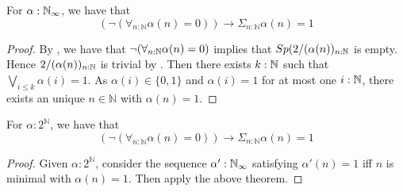 \begin{theorem}\label{MarkovPrinciple}
  For $\alpha:\mathbb{N}_{\infty}$, we have that 
  \begin{equation}
    (\neg (\forall_{n:\mathbb N} \alpha (n)= 0)) \to \Sigma_{n:\mathbb N} \alpha (n)= 1
  \end{equation}
\end{theorem}
\begin{proof}
  By , we have that $\neg(\forall_{n:\mathbb{N}} \alpha(n) = 0)$ implies that 
  $Sp(2/(\alpha(n))_{n:\mathbb{N}}$ is empty. 
  Hence $2/(\alpha(n))_{n:\mathbb{N}}$ is trivial by . 
  Then there exists $k:\mathbb{N}$ such that $\bigvee_{i\leq k} \alpha(i) = 1$. 
  As $\alpha(i) \in \{0,1\}$ and $\alpha(i) = 1$ for at most one $i:\mathbb{N}$, 
  there exists an unique $n\in\mathbb N$ with $\alpha(n) = 1$. 
\end{proof}

\begin{corollary}
  For $\alpha:2^\mathbb N$, we have that 
  \begin{equation}
    (\neg (\forall_{n:\mathbb N} \alpha (n)= 0)) \to \Sigma_{n:\mathbb N} \alpha (n)= 1
  \end{equation}
\end{corollary}
\begin{proof}
  Given $\alpha:2^\mathbb N$, consider the sequence $\alpha':\mathbb{N}_{\infty}$ satisfying $\alpha'(n) = 1$ iff 
  $n$ is minimal with $\alpha(n) = 1$. Then apply the above theorem.
\end{proof}

